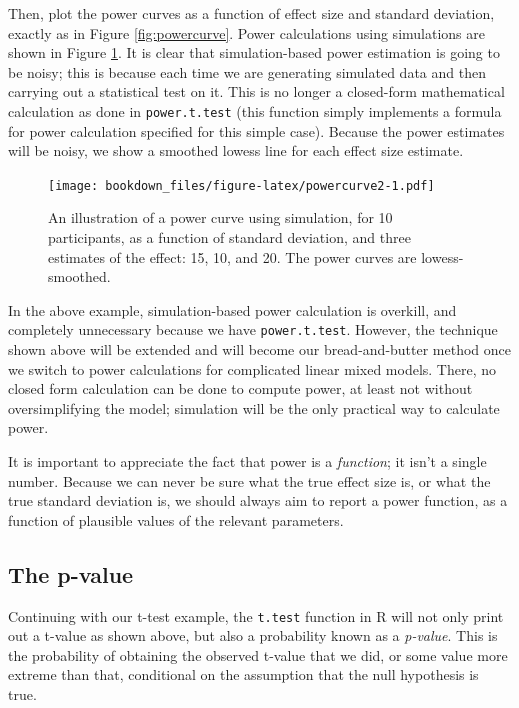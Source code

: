 \documentclass[12pt,]{krantz}
\begin{document}
Then, plot the power curves as a function of effect size and standard deviation, exactly as in Figure \ref{fig:powercurve}. Power calculations using simulations are shown in Figure \ref{fig:powercurve2}. It is clear that simulation-based power estimation is going to be noisy; this is because each time we are generating simulated data and then carrying out a statistical test on it. This is no longer a closed-form mathematical calculation as done in \texttt{power.t.test} (this function simply implements a formula for power calculation specified for this simple case). Because the power estimates will be noisy, we show a smoothed lowess line for each effect size estimate.

\begin{figure}
\centering
\texttt{[image: bookdown\_files/figure-latex/powercurve2-1.pdf]}
\caption{\label{fig:powercurve2}An illustration of a power curve using simulation, for 10 participants, as a function of standard deviation, and three estimates of the effect: 15, 10, and 20. The power curves are lowess-smoothed.}
\end{figure}

In the above example, simulation-based power calculation is overkill, and completely unnecessary because we have \texttt{power.t.test}. However, the technique shown above will be extended and will become our bread-and-butter method once we switch to power calculations for complicated linear mixed models. There, no closed form calculation can be done to compute power, at least not without oversimplifying the model; simulation will be the only practical way to calculate power.

It is important to appreciate the fact that power is a \emph{function}; it isn't a single number. Because we can never be sure what the true effect size is, or what the true standard deviation is, we should always aim to report a power function, as a function of plausible values of the relevant parameters.

\hypertarget{the-p-value}{%
\subsection{The p-value}\label{the-p-value}}

Continuing with our t-test example, the \texttt{t.test} function in R will not only print out a t-value as shown above, but also a probability known as a \emph{p-value}. This is the probability of obtaining the observed t-value that we did, or some value more extreme than that, conditional on the assumption that the null hypothesis is true.
\end{document}
